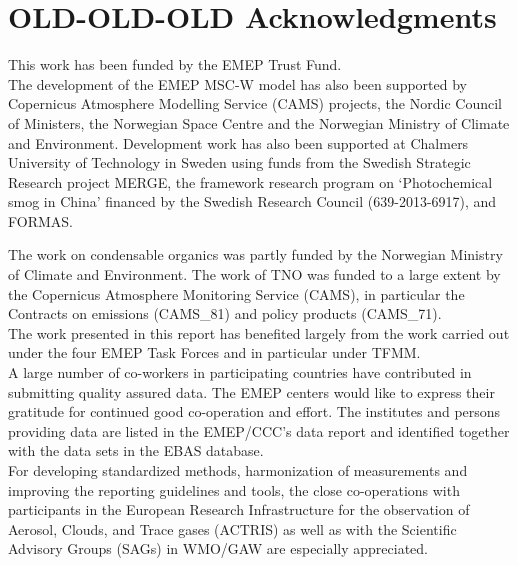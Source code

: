 \chapter*{OLD-OLD-OLD Acknowledgments}

\enlargethispage{3\baselineskip}

\vspace{-2cm}

This work has been funded by the EMEP Trust Fund.\\

The development of the EMEP MSC-W model has also been supported by Copernicus Atmosphere Modelling Service (CAMS) projects, the Nordic Council of Ministers, the Norwegian Space Centre and the Norwegian Ministry of Climate and Environment.
Development work has also been supported at Chalmers University of Technology in Sweden using funds from the Swedish Strategic Research project MERGE, the 
framework research program on `Photochemical smog in China' financed by
the Swedish Research Council (639-2013-6917), and FORMAS.

The work on condensable organics was partly funded by the Norwegian Ministry of Climate and Environment.
The work of TNO was funded
to a large extent by the Copernicus Atmosphere Monitoring Service (CAMS),
in particular the Contracts on emissions (CAMS\_81) and policy products
(CAMS\_71).\\


The work presented in this report has benefited largely from the work carried out under the four EMEP Task Forces and in particular under TFMM.\\

A large number of co-workers in participating countries have contributed in submitting quality assured data. The EMEP centers would like to express their gratitude for continued good co-operation and effort. The institutes and persons providing data are listed in the EMEP/CCC's data report and identified together with the data sets in the EBAS database. \\

For developing standardized methods, harmonization of measurements and improving the reporting guidelines and tools, the close co-operations with participants in the European Research Infrastructure for the observation of Aerosol, Clouds, and Trace gases (ACTRIS) as well as with the Scientific Advisory Groups (SAGs) in WMO/GAW are especially appreciated. \\




